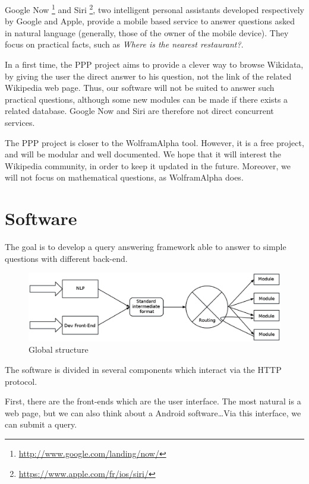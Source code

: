 \documentclass[a4paper,10pt]{article}
\begin{document}
Google Now \footnote{\url{http://www.google.com/landing/now/}} and Siri
\footnote{\url{https://www.apple.com/fr/ios/siri/}}, two intelligent personal assistants
developed respectively by Google and Apple, provide a mobile based service to 
answer questions asked in natural language (generally, those of the owner of the
mobile device). They focus on practical facts, such as \emph{Where is the nearest
restaurant?}.

In a first time, the PPP project aims to provide a clever way to browse Wikidata, by giving the 
user the direct answer to his question, not the link of the related Wikipedia
web page. Thus, our software will not be suited to answer such practical questions,
although some new modules can be made if there exists a related database. Google Now
and Siri are therefore not direct concurrent services.

The PPP project is closer to the WolframAlpha tool. However, it is a free project,
and will be modular and well documented. We hope that it will interest the 
Wikipedia community, in order to keep it updated in the future. Moreover,
we will not focus on mathematical questions, as WolframAlpha does.


\section{Software}

The goal is to develop a query answering framework able to answer to simple questions with different back-end. 

\begin{figure}[!h]
    \centering
    \includegraphics[scale=0.39]{images/Structure-PPP-en.eps}
    \caption{Global structure}
\end{figure}

The software is divided in several components which interact via the HTTP protocol.

First, there are the front-ends which are the user interface. The most natural is a web page, but we can also think about a Android software\ldots Via this interface, we can submit a query.
\end{document}
